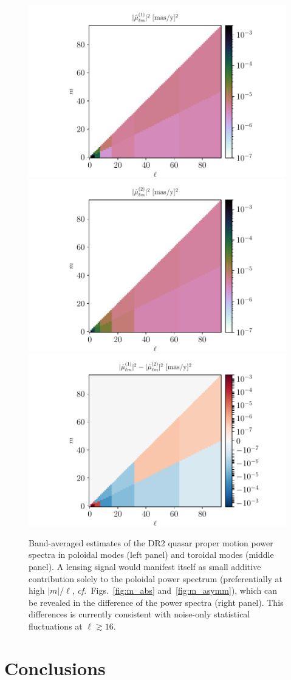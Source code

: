 \documentclass[prd,aps,twocolumn,nofootinbib,superscriptaddress,preprintnumbers,balancelastpage,longbibliography,floatfix]{revtex4-1}
\begin{document}
\begin{figure}[tbp]
\centering
\includegraphics[trim = 69 0 56 0, clip, height=0.30\textwidth]{plots/pow1_spec_raw_weight_B.pdf} 
\includegraphics[trim = 69 0 56 0, clip, height=0.30\textwidth]{plots/pow2_spec_raw_weight_B.pdf}
\includegraphics[trim = 69 0 46 0, clip, height=0.30\textwidth]{plots/pow_diff_spec_raw_weight_B.pdf}
\caption{Band-averaged estimates of the \Gaia DR2 quasar proper motion power spectra in poloidal modes (left panel) and toroidal modes (middle panel). A lensing signal would manifest itself as small additive contribution solely to the poloidal power spectrum (preferentially at high $|m|/\ell$, \emph{cf.}~Figs.~\ref{fig:m_abs} and~\ref{fig:m_asymm}), which can be revealed in the difference of the power spectra (right panel). This differences is currently consistent with noise-only statistical fluctuations at $\ell \gtrsim 16$. }
\label{fig:pow_spec}
\end{figure}

\section{Conclusions}
\label{sec:conclusions}
\end{document}
